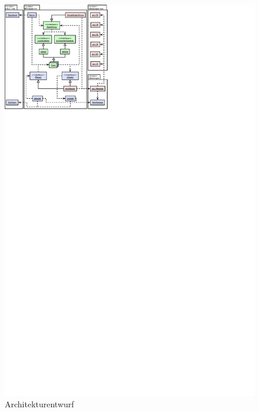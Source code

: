 \begin{figure}[H]
	\centering
	\includegraphics[width=2.0\textwidth]{dia/architecture}
	\caption{Architekturentwurf}
	\label{draft:architecture}
\end{figure}


